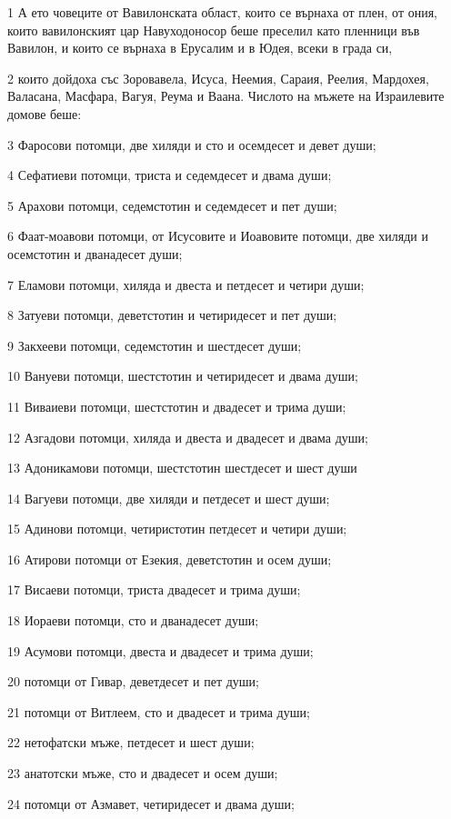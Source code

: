 \par 1 А ето човеците от Вавилонската област, които се върнаха от плен, от ония, които вавилонският цар Навуходоносор беше преселил като пленници във Вавилон, и които се върнаха в Ерусалим и в Юдея, всеки в града си,
\par 2 които дойдоха със Зоровавела, Исуса, Неемия, Сараия, Реелия, Мардохея, Валасана, Масфара, Вагуя, Реума и Ваана. Числото на мъжете на Израилевите домове беше:
\par 3 Фаросови потомци, две хиляди и сто и осемдесет и девет души;
\par 4 Сефатиеви потомци, триста и седемдесет и двама души;
\par 5 Арахови потомци, седемстотин и седемдесет и пет души;
\par 6 Фаат-моавови потомци, от Исусовите и Иоавовите потомци, две хиляди и осемстотин и дванадесет души;
\par 7 Еламови потомци, хиляда и двеста и петдесет и четири души;
\par 8 Затуеви потомци, деветстотин и четиридесет и пет души;
\par 9 Закхееви потомци, седемстотин и шестдесет души;
\par 10 Вануеви потомци, шестстотин и четиридесет и двама души;
\par 11 Виваиеви потомци, шестстотин и двадесет и трима души;
\par 12 Азгадови потомци, хиляда и двеста и двадесет и двама души;
\par 13 Адоникамови потомци, шестстотин шестдесет и шест души
\par 14 Вагуеви потомци, две хиляди и петдесет и шест души;
\par 15 Адинови потомци, четиристотин петдесет и четири души;
\par 16 Атирови потомци от Езекия, деветстотин и осем души;
\par 17 Висаеви потомци, триста двадесет и трима души;
\par 18 Иораеви потомци, сто и дванадесет души;
\par 19 Асумови потомци, двеста и двадесет и трима души;
\par 20 потомци от Гивар, деветдесет и пет души;
\par 21 потомци от Витлеем, сто и двадесет и трима души;
\par 22 нетофатски мъже, петдесет и шест души;
\par 23 анатотски мъже, сто и двадесет и осем души;
\par 24 потомци от Азмавет, четиридесет и двама души;
